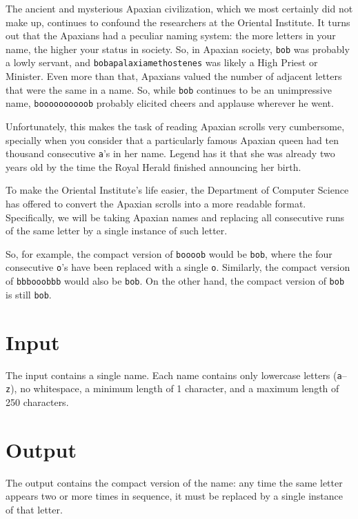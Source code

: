 
The ancient and mysterious Apaxian civilization, which we most certainly did not make up, continues to confound the researchers at the Oriental Institute. It turns out that the Apaxians had a peculiar naming system: the more letters in your name, the higher your status in society. So, in Apaxian society, \texttt{bob} was probably a lowly servant, and \texttt{bobapalaxiamethostenes} was likely a High Priest or Minister. Even more than that, Apaxians valued the number of adjacent letters that were the same in a name. So,  while \texttt{bob} continues to be an unimpressive name, \texttt{boooooooooob} probably elicited cheers and applause wherever he went.

Unfortunately, this makes the task of reading Apaxian scrolls very cumbersome, specially when you consider that a particularly famous Apaxian queen had ten thousand consecutive \texttt{a}'s in her name. Legend has it that she was already two years old by the time the Royal Herald finished announcing her birth.

To make the Oriental Institute's life easier, the Department of Computer Science has offered to convert the Apaxian scrolls into a more readable format. Specifically, we will be taking Apaxian names and replacing all consecutive runs of the same letter by a single instance of such letter.

So, for example, the compact version of \texttt{boooob} would be \texttt{bob}, where the four consecutive \texttt{o}'s have been replaced with a single \texttt{o}. Similarly, the compact version of \texttt{bbbooobbb} would also be \texttt{bob}. On the other hand, the compact version of \texttt{bob} is still \texttt{bob}.

\section*{Input}

The input contains a single name. Each name contains only lowercase letters (\texttt{a}--\texttt{z}), no whitespace, a minimum length of 1 character, and a maximum length of 250 characters. 

\section*{Output}

The output contains the compact version of the name: any time the same letter appears two or more times in sequence, it must be replaced by a single instance of that letter.
